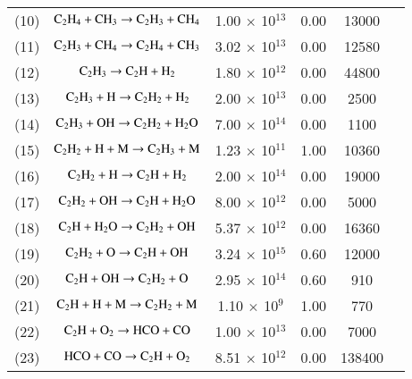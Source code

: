 \documentclass{warpdoc}
\begin{document}
\begin{table}[h]
\begin{center}
\begin{threeparttable}
\begin{tabular}{cccccc}
(10) & $\rm  C_2 H_4 + C H_3 \rightarrow C_2 H_3 + C H_4  $ & 1.00 $\times$ 10$^{13}$  & 0.00 & 13000 &\cite{caf:1989:refael}\\

(11) & $\rm  C_2 H_3 + C H_4  \rightarrow C_2 H_4 + C H_3 $ & 3.02 $\times$ 10$^{13}$  & 0.00 & 12580 &\cite{caf:1989:refael}\\

(12) & $\rm  C_2 H_3  \rightarrow C_2 H +H_2 $ & 1.80 $\times$ 10$^{12}$  & 0.00 &44800 &\cite{ef:2017:zettervall}\\

(13) & $\rm  C_2 H_3 +H \rightarrow C_2 H_2 +H_2 $ & 2.00 $\times$ 10$^{13}$  & 0.00 &2500 &\cite{caf:1989:refael}\\

(14) & $\rm  C_2 H_3 +OH \rightarrow C_2 H_2 +H_2 O $ & 7.00 $\times$ 10$^{14}$  & 0.00 &1100 &\cite{ef:2017:zettervall}\\

(15) & $\rm  C_2 H_2 +H+M \rightarrow C_2 H_3 +M $ & 1.23 $\times$ 10$^{11}$  & 1.00 &10360 &\cite{caf:1989:refael}\\

(16) & $\rm  C_2 H_2 +H\rightarrow C_2 H +H_2 $ & 2.00 $\times$ 10$^{14}$  & 0.00 &19000 &\cite{caf:1989:refael}\\

(17) & $\rm  C_2 H_2 +OH\rightarrow C_2 H +H_2 O $ &8.00 $\times$ 10$^{12}$  & 0.00 &5000 &\cite{caf:1989:refael}\\

(18) & $\rm  C_2 H +H_2 O\rightarrow C_2 H_2 + OH $ &5.37 $\times$ 10$^{12}$  & 0.00 &16360 &\cite{caf:1989:refael}\\

(19) & $\rm  C_2 H_2 + O\rightarrow C_2 H + OH $ &3.24 $\times$ 10$^{15}$  & 0.60 &12000 &\cite{caf:1989:refael}\\

(20) & $\rm  C_2 H + OH\rightarrow C_2 H_2 + O $ &2.95 $\times$ 10$^{14}$  & 0.60 &910 &\cite{caf:1989:refael}\\

(21) & $\rm  C_2 H + H + M \rightarrow C_2 H_2 + M $ &1.10 $\times$ 10$^{9}$  & 1.00 &770 &\cite{caf:1989:refael}\\

(22) & $\rm  C_2 H + O_2 \rightarrow HCO +CO $ &1.00 $\times$ 10$^{13}$  & 0.00 &7000 &\cite{caf:1989:refael}\\

(23) & $\rm HCO+CO \rightarrow C_2 H + O_2 $ &8.51 $\times$ 10$^{12}$  & 0.00 &138400 &\cite{caf:1989:refael}\\


\end{tabular}
\end{threeparttable}
\end{center}
\end{table}
\end{document}
